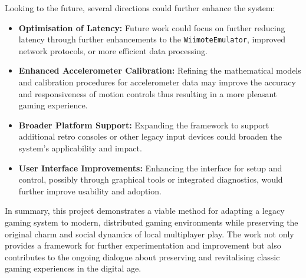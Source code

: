 Looking to the future, several directions could further enhance the system:
\begin{itemize}
	\item \textbf{Optimisation of Latency:} Future work could focus on further reducing latency through further enhancements to the \texttt{WiimoteEmulator}, improved network protocols, or more efficient data processing.
	\item \textbf{Enhanced Accelerometer Calibration:} Refining the mathematical models and calibration procedures for accelerometer data may improve the accuracy and responsiveness of motion controls thus resulting in a more pleasant gaming experience.
	\item \textbf{Broader Platform Support:} Expanding the framework to support additional retro consoles or other legacy input devices could broaden the system’s applicability and impact.
	\item \textbf{User Interface Improvements:} Enhancing the interface for setup and control, possibly through graphical tools or integrated diagnostics, would further improve usability and adoption.
\end{itemize}

In summary, this project demonstrates a viable method for adapting a legacy gaming system to modern, distributed gaming environments while preserving the original charm and social dynamics of local multiplayer play. The work not only provides a framework for further experimentation and improvement but also contributes to the ongoing dialogue about preserving and revitalising classic gaming experiences in the digital age.
